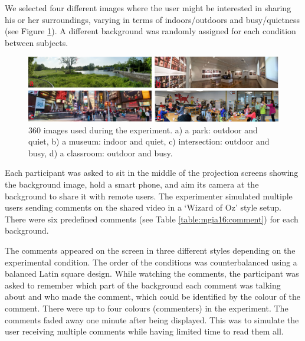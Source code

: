 We selected four different images where the user might be interested in sharing his or her surroundings, varying in terms of indoors/outdoors and busy/quietness (see Figure \ref{fig:mgia16:backgrounds}). A different background was randomly assigned for each condition between subjects. 

\begin{figure}[b]
  \centering
  \includegraphics[width=\linewidth]{images/mgia16/backgrounds-legend.png}
  \caption{360 images used during the experiment. a) a park: outdoor and quiet, b) a museum: indoor and quiet, c) intersection: outdoor and busy, d) a classroom: outdoor and busy.}
	\label{fig:mgia16:backgrounds}
\end{figure}

Each participant was asked to sit in the middle of the projection screens showing the background image, hold a smart phone, and aim its camera at the background to share it with remote users. The experimenter simulated multiple users sending comments on the shared video in a ‘Wizard of Oz' style setup. There were six predefined comments (see Table \ref{table:mgia16:comment}) for each background. 

The comments appeared on the screen in three different styles depending on the experimental condition. The order of the conditions was counterbalanced using a balanced Latin square design. While watching the comments, the participant was asked to remember which part of the background each comment was talking about and who made the comment, which could be identified by the colour of the comment. There were up to four colours (commenters) in the experiment. The comments faded away one minute after being displayed. This was to simulate the user receiving multiple comments while having limited time to read them all.

